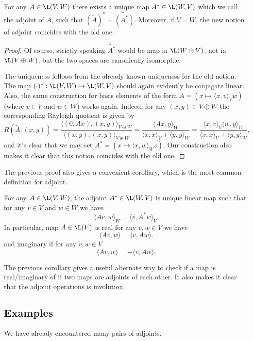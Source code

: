 \begin{lause}
	For any $A \in \L(V, W)$ there exists a unique map $A^{*} \in \L(W, V)$ which we call the adjoint of $A$, such that $(\tilde{A})^{*} = \tilde{(A^{*})}$. Moreover, if $V = W$, the new notion of adjoint coincides with the old one.
\end{lause}

\begin{proof}
	Of course, strictly speaking $\tilde{A^{*}}$ would be map in $\L(W \oplus V)$, not in $\L(V \oplus W)$, but the two spaces are canonically isomorphic.

	The uniqueness follows from the already known uniqueness for the old notion. The map $(\cdot)^{*} : \L(V, W) \to \L(W, V)$ should again evidently be conjugate linear. Also, the same construction for basis elements of the form $A = (x \mapsto \langle x, v \rangle_{V} w)$ (where $v \in V$ and $w \in W$) works again. Indeed, for any $(x, y) \in V \oplus W$ the corresponding Rayleigh quotient is given by
	\[
		R(\tilde{A}, (x, y)) = \frac{\langle (0, A x), (x, y)\rangle_{V \oplus W} }{\langle (x, y), (x, y) \rangle_{V \oplus W}} = \frac{\langle A x, y\rangle_{W} }{\langle x, x \rangle_{V} + \langle y, y \rangle_{W}} = \frac{\langle x, v\rangle_{V} \langle w, y\rangle_{W} }{\langle x, x \rangle_{V} + \langle y, y \rangle_{W}},
	\]
	and it's clear that we may set $A^{*} = (x \mapsto \langle x, w \rangle_{W} v)$. Our construction also makes it clear that this notion coincides with the old one.
\end{proof}

The previous proof also gives a convenient corollary, which is the most common definition for adjoint.

\begin{kor}
	For any $A \in \L(V, W)$, the adjoint $A^{*} \in \L(W, V)$ is unique linear map such that for any $v \in V$ and $w \in W$ we have
	\[
		\langle A v, w \rangle_{W} = \langle v, A^{*} w \rangle_{V}.
	\]
	In particular, map $A \in \L(V)$ is real for any $v, w \in V$ we have
	\[
		\langle A v, w \rangle = \langle v, A w \rangle.
	\]
	and imaginary if for any $v, w \in V$
	\[
		\langle A v, w \rangle = -\langle v, A w \rangle.
	\]
\end{kor}

The previous corollary gives a useful alternate way to check if a map is real/imaginary of if two maps are adjoints of each other. It also makes it clear that the adjoint operations is involution.

\subsection{Examples}
We have already encountered many pairs of adjoints.

